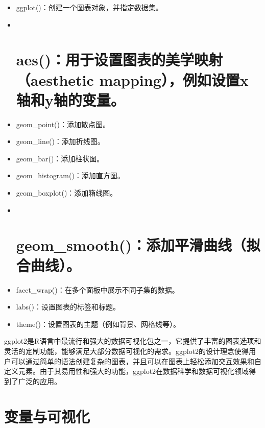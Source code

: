\documentclass[]{book}
\begin{document}
\begin{itemize}
\item
  ggplot()：创建一个图表对象，并指定数据集。
\item ~
  \hypertarget{aesux7528ux4e8eux8bbeux7f6eux56feux8868ux7684ux7f8eux5b66ux6620ux5c04aesthetic-mappingux4f8bux5982ux8bbeux7f6exux8f74ux548cyux8f74ux7684ux53d8ux91cf}{%
  \section{aes()：用于设置图表的美学映射（aesthetic mapping），例如设置x轴和y轴的变量。}\label{aesux7528ux4e8eux8bbeux7f6eux56feux8868ux7684ux7f8eux5b66ux6620ux5c04aesthetic-mappingux4f8bux5982ux8bbeux7f6exux8f74ux548cyux8f74ux7684ux53d8ux91cf}}
\item
  geom\_point()：添加散点图。
\item
  geom\_line()：添加折线图。
\item
  geom\_bar()：添加柱状图。
\item
  geom\_histogram()：添加直方图。
\item
  geom\_boxplot()：添加箱线图。
\item ~
  \hypertarget{geom_smoothux6dfbux52a0ux5e73ux6ed1ux66f2ux7ebfux62dfux5408ux66f2ux7ebf}{%
  \section{geom\_smooth()：添加平滑曲线（拟合曲线）。}\label{geom_smoothux6dfbux52a0ux5e73ux6ed1ux66f2ux7ebfux62dfux5408ux66f2ux7ebf}}
\item
  facet\_wrap()：在多个面板中展示不同子集的数据。
\item
  labs()：设置图表的标签和标题。
\item
  theme()：设置图表的主题（例如背景、网格线等）。
\end{itemize}

ggplot2是R语言中最流行和强大的数据可视化包之一，它提供了丰富的图表选项和灵活的定制功能，能够满足大部分数据可视化的需求。ggplot2的设计理念使得用户可以通过简单的语法创建复杂的图表，并且可以在图表上轻松添加交互效果和自定义元素。由于其易用性和强大的功能，ggplot2在数据科学和数据可视化领域得到了广泛的应用。

\hypertarget{ux53d8ux91cfux4e0eux53efux89c6ux5316}{%
\section{变量与可视化}\label{ux53d8ux91cfux4e0eux53efux89c6ux5316}}
\end{document}
